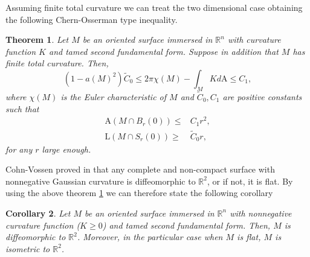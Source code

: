 \documentclass[a4paper]{amsart}
\newtheorem{theorem}{Theorem}[section]
\newtheorem{corollary}[theorem]{Corollary}
\theoremstyle{definition}
\numberwithin{equation}{section}
\begin{document}
Assuming finite total curvature we can treat the two dimensional case obtaining the following Chern-Osserman type inequality. 
\begin{theorem}\label{theo2}Let $M$ be an oriented surface immersed in ${\mathbb{R}}^n$ with curvature function $K$ and  tamed second fundamental form. Suppose in addition that $M$ has finite total curvature. 
Then, 
\begin{equation}
\left(1-a(M)^2\right)\widetilde C_0\leq 2\pi\chi(M)-\int_MKd\text{A}\leq C_1,
\end{equation}
where $\chi(M)$  is the Euler characteristic of $M$ and $\widetilde C_0,C_1$ are positive constants such that
\begin{equation}
\begin{aligned}
\text{A}(M\cap B_r(0))\leq & C_1 r^2,\\
\text{L}(M\cap S_r(0))\geq & \widetilde C_0 r,
\end{aligned}
\end{equation}
for any $r$ large enough.
\end{theorem} 

Cohn-Vossen proved in \cite{CV} that any complete and non-compact surface with nonnegative Gaussian curvature is diffeomorphic to ${\mathbb{R}}^2$, or if not, it is flat. By using the above theorem  \ref{theo2} we can therefore state the following corollary 

\begin{corollary}\label{nonnegative}Let $M$ be an oriented surface immersed in ${\mathbb{R}}^n$ with nonnegative curvature function ($K\geq 0$) and  tamed second fundamental form. Then, $M$ is diffeomorphic to ${\mathbb{R}}^2$. Moreover, in the particular case when $M$ is flat, $M$ is isometric to ${\mathbb{R}}^2$.
\end{corollary} 
  
\end{document}
